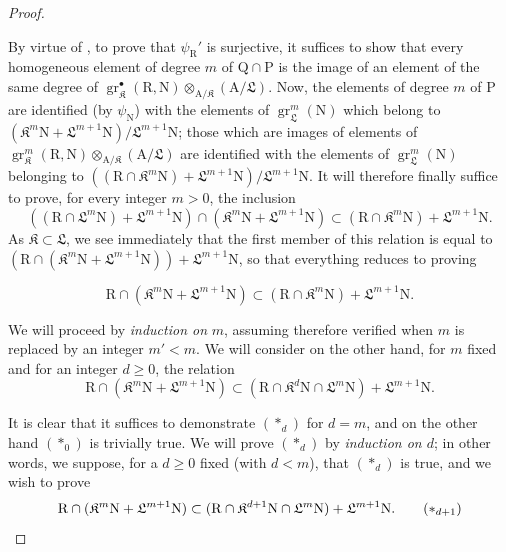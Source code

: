 \begin{proof}
\begin{env}[19.7.1.5]
\label{IV.19.7.1.5}
By virtue of , to prove that $\psi_\mathrm{R}'$ is surjective, it suffices to show that every homogeneous element of degree $m$ of $\mathrm{Q}\cap\mathrm{P}$ is the image of an element of the same degree of $\operatorname{gr}_\mathfrak K^\bullet(\mathrm{R},\mathrm{N})\otimes_{\mathrm{A}/\mathfrak K}(\mathrm{A}/\mathfrak{L})$. Now, the elements of degree $m$ of $\mathrm{P}$ are identified (by $\psi_\mathrm{N}$) with the elements of $\operatorname{gr}_\mathfrak{L}^m(\mathrm{N})$ which belong to $(\mathfrak K^m\mathrm{N}+\mathfrak{L}^{m+1}\mathrm{N})/\mathfrak{L}^{m+1}\mathrm{N}$; those which are images of elements of $\operatorname{gr}_\mathfrak K^m(\mathrm{R},\mathrm{N})\otimes_{\mathrm{A}/\mathfrak K}(\mathrm{A}/\mathfrak{L})$ are identified with the elements of $\operatorname{gr}_\mathfrak{L}^m(\mathrm{N})$ belonging to $((\mathrm{R}\cap\mathfrak K^m\mathrm{N})+\mathfrak{L}^{m+1}\mathrm{N})/\mathfrak{L}^{m+1}\mathrm{N}$. It will therefore finally suffice to prove, for every integer $m>0$, the inclusion
\[
  ((\mathrm{R}\cap\mathfrak{L}^m\mathrm{N})+\mathfrak{L}^{m+1}\mathrm{N})\cap(\mathfrak K^m\mathrm{N}+\mathfrak{L}^{m+1}\mathrm{N})\subset(\mathrm{R}\cap\mathfrak K^m\mathrm{N})+\mathfrak{L}^{m+1}\mathrm{N}.
\]
As $\mathfrak K\subset\mathfrak{L}$, we see immediately that the first member of this relation is equal to $(\mathrm{R}\cap(\mathfrak K^m\mathrm{N}+\mathfrak{L}^{m+1}\mathrm{N}))+\mathfrak{L}^{m+1}\mathrm{N}$, so that everything reduces to proving
\end{env}
\begin{env}[19.7.1.6]
\label{IV.19.7.1.6}
\[
  \mathrm{R}\cap(\mathfrak K^m\mathrm{N}+\mathfrak{L}^{m+1}\mathrm{N})\subset(\mathrm{R}\cap\mathfrak K^m\mathrm{N})+\mathfrak{L}^{m+1}\mathrm{N}.
\]
\end{env}

We will proceed by \emph{induction on} $m$, assuming therefore  verified when $m$ is replaced by an integer $m'<m$. We will consider on the other hand, for $m$ fixed and for an integer $d\geqslant 0$, the relation
\begin{equation}
  \mathrm{R}\cap(\mathfrak K^m\mathrm{N}+\mathfrak{L}^{m+1}\mathrm{N})\subset(\mathrm{R}\cap\mathfrak K^d\mathrm{N}\cap\mathfrak{L}^m\mathrm{N})+\mathfrak{L}^{m+1}\mathrm{N}.
  \tag{$*_d$}
\end{equation}

It is clear that it suffices to demonstrate $(*_d)$ for $d=m$, and on the other hand $(*_0)$ is trivially true. We will prove $(*_d)$ by \emph{induction on $d$}; in other words, we suppose, for a $d\geqslant 0$ fixed (with $d<m$), that $(*_d)$ is true, and we wish to prove
\begin{equation}
  \mathrm{R}\cap(\mathfrak K^m\mathrm{N}+\mathfrak{L}^{m+1}\mathrm{N})\subset(\mathrm{R}\cap\mathfrak K^{d+1}\mathrm{N}\cap\mathfrak{L}^m\mathrm{N})+\mathfrak{L}^{m+1}\mathrm{N}.
  \tag{$*_{d+1}$}
\end{equation}


\end{proof}
